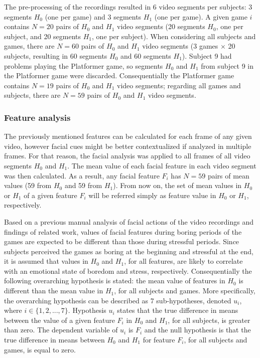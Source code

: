 The pre-processing of the recordings resulted in 6 video segments per subjects: 3 segments $H_0$ (one per game) and 3 segments $H_1$ (one per game). A given game $i$ contains $N=20$ pairs of $H_0$ and $H_1$ video segments (20 segments $H_0$, one per subject, and 20 segments $H_1$, one per subject). When considering all subjects and games, there are $N=60$ pairs of $H_0$ and $H_1$ video segments (3 games $\times$ 20 subjects, resulting in 60 segments $H_0$ and 60 segments $H_1$). Subject 9 had problems playing the Platformer game, so segments $H_0$ and $H_1$ from subject 9 in the Platformer game were discarded. Consequentially the Platformer game contains $N=19$ pairs of $H_0$ and $H_1$ video segments; regarding all games and subjects, there are $N=59$ pairs of $H_0$ and $H_1$ video segments.

\subsubsection{Feature analysis}

The previously mentioned features can be calculated for each frame of any given video, however facial cues might be better contextualized if analyzed in multiple frames. For that reason, the facial analysis was applied to all frames of all video segments $H_0$ and $H_1$. The mean value of each facial feature in each video segment was then calculated. As a result, any facial feature $F_i$ has $N=59$ pairs of mean values (59 from $H_0$ and 59 from $H_1$). From now on, the set of mean values in $H_0$ or $H_1$ of a given feature $F_i$ will be referred simply as feature value in $H_0$ or $H_1$, respectively.

Based on a previous manual analysis of facial actions of the video recordings \parencite{bevilacqua2016variations} and findings of related work, values of facial features during boring periods of the games are expected to be different than those during stressful periods. Since subjects perceived the games as boring at the beginning and stressful at the end, it is assumed that values in $H_0$ and $H_1$, for all features, are likely to correlate with an emotional state of boredom and stress, respectively. Consequentially the following overarching hypothesis is stated: the mean value of features in $H_0$ is different than the mean value in $H_1$, for all subjects and games. More specifically, the overarching hypothesis can be described as 7 sub-hypotheses, denoted $u_i$, where $i \in \{1, 2, ..., 7\}$. Hypothesis $u_i$ states that the true difference in means between the value of a given feature $F_i$ in $H_0$ and $H_1$, for all subjects, is greater than zero. The dependent variable of $u_i$ is $F_i$ and the null hypothesis is that the true difference in means between $H_0$ and $H_1$ for feature $F_i$, for all subjects and games, is equal to zero.

